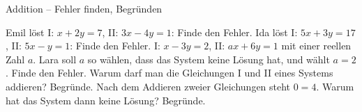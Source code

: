 \begin{aufgabe}{Addition – Fehler finden, Begründen}
\begin{teile}
\teil Emil löst I: $x + 2y = 7$, II: $3x - 4y = 1$:  Finde den Fehler.
\teil Ida löst I: $5x + 3y = 17$, II: $5x - y = 1$:  Finde den Fehler.
\teil I: $x - 3y = 2$, II: $ax + 6y = 1$ mit einer reellen Zahl $a$. Lara soll $a$ so wählen, dass das System keine Lösung hat, und wählt $a = 2$. Finde den Fehler.
\teil Warum darf man die Gleichungen I und II eines Systems addieren? Begründe.
\teil Nach dem Addieren zweier Gleichungen steht $0 = 4$. Warum hat das System dann keine Lösung? Begründe.
\end{teile}
\end{aufgabe}

